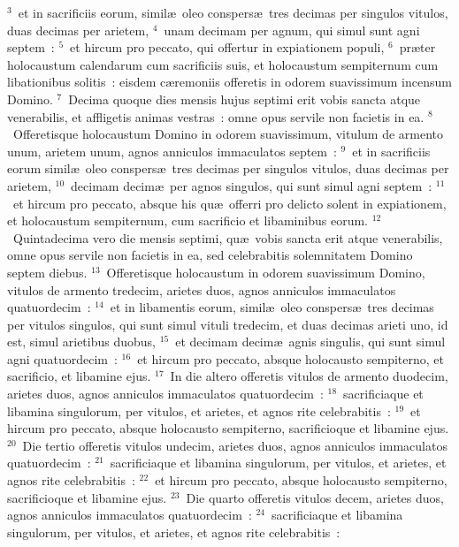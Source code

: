 ${}^{3}$~et in sacrificiis eorum, simil\ae\ oleo conspers\ae\ tres decimas per singulos vitulos, duas decimas per arietem,
${}^{4}$~unam decimam per agnum, qui simul sunt agni septem~:
${}^{5}$~et hircum pro peccato, qui offertur in expiationem populi,
${}^{6}$~pr\ae ter holocaustum calendarum cum sacrificiis suis, et holocaustum sempiternum cum libationibus solitis~: eisdem c\ae remoniis offeretis in odorem suavissimum incensum Domino.
${}^{7}$~Decima quoque dies mensis hujus septimi erit vobis sancta atque venerabilis, et affligetis animas vestras~: omne opus servile non facietis in ea.
${}^{8}$~Offeretisque holocaustum Domino in odorem suavissimum, vitulum de armento unum, arietem unum, agnos anniculos immaculatos septem~:
${}^{9}$~et in sacrificiis eorum simil\ae\ oleo conspers\ae\ tres decimas per singulos vitulos, duas decimas per arietem,
${}^{10}$~decimam decim\ae\ per agnos singulos, qui sunt simul agni septem~:
${}^{11}$~et hircum pro peccato, absque his qu\ae\ offerri pro delicto solent in expiationem, et holocaustum sempiternum, cum sacrificio et libaminibus eorum.
${}^{12}$~Quintadecima vero die mensis septimi, qu\ae\ vobis sancta erit atque venerabilis, omne opus servile non facietis in ea, sed celebrabitis solemnitatem Domino septem diebus.
${}^{13}$~Offeretisque holocaustum in odorem suavissimum Domino, vitulos de armento tredecim, arietes duos, agnos anniculos immaculatos quatuordecim~:
${}^{14}$~et in libamentis eorum, simil\ae\ oleo conspers\ae\ tres decimas per vitulos singulos, qui sunt simul vituli tredecim, et duas decimas arieti uno, id est, simul arietibus duobus,
${}^{15}$~et decimam decim\ae\ agnis singulis, qui sunt simul agni quatuordecim~:
${}^{16}$~et hircum pro peccato, absque holocausto sempiterno, et sacrificio, et libamine ejus.
${}^{17}$~In die altero offeretis vitulos de armento duodecim, arietes duos, agnos anniculos immaculatos quatuordecim~:
${}^{18}$~sacrificiaque et libamina singulorum, per vitulos, et arietes, et agnos rite celebrabitis~:
${}^{19}$~et hircum pro peccato, absque holocausto sempiterno, sacrificioque et libamine ejus.
${}^{20}$~Die tertio offeretis vitulos undecim, arietes duos, agnos anniculos immaculatos quatuordecim~:
${}^{21}$~sacrificiaque et libamina singulorum, per vitulos, et arietes, et agnos rite celebrabitis~:
${}^{22}$~et hircum pro peccato, absque holocausto sempiterno, sacrificioque et libamine ejus.
${}^{23}$~Die quarto offeretis vitulos decem, arietes duos, agnos anniculos immaculatos quatuordecim~:
${}^{24}$~sacrificiaque et libamina singulorum, per vitulos, et arietes, et agnos rite celebrabitis~:
